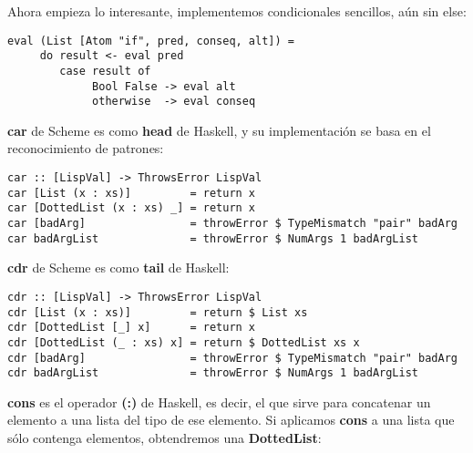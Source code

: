 Ahora empieza lo interesante, implementemos condicionales sencillos, a\'un sin else:\\

\begin{minipage}{\linewidth}
\begin{footnotesize}
\begin{lstlisting}[frame=single]
eval (List [Atom "if", pred, conseq, alt]) = 
     do result <- eval pred
        case result of
             Bool False -> eval alt
             otherwise  -> eval conseq
\end{lstlisting}
\end{footnotesize}
\end{minipage}

\textbf{car} de Scheme es como \textbf{head} de Haskell, y su implementaci\'on se basa en el reconocimiento de patrones:\\

\begin{minipage}{\linewidth}
\begin{footnotesize}
\begin{lstlisting}[frame=single]
car :: [LispVal] -> ThrowsError LispVal
car [List (x : xs)]         = return x
car [DottedList (x : xs) _] = return x
car [badArg]                = throwError $ TypeMismatch "pair" badArg
car badArgList              = throwError $ NumArgs 1 badArgList
\end{lstlisting}
\end{footnotesize}
\end{minipage}

\textbf{cdr} de Scheme es  como \textbf{tail} de Haskell:\\

\begin{minipage}{\linewidth}
\begin{footnotesize}
\begin{lstlisting}[frame=single]
cdr :: [LispVal] -> ThrowsError LispVal
cdr [List (x : xs)]         = return $ List xs
cdr [DottedList [_] x]      = return x
cdr [DottedList (_ : xs) x] = return $ DottedList xs x
cdr [badArg]                = throwError $ TypeMismatch "pair" badArg
cdr badArgList              = throwError $ NumArgs 1 badArgList
\end{lstlisting}
\end{footnotesize}
\end{minipage}

\textbf{cons} es el operador \textbf{(:)} de Haskell, es decir, el que sirve para concatenar un elemento a una lista del tipo de ese elemento. Si aplicamos \textbf{cons} a una lista que s\'olo contenga elementos, obtendremos una \textbf{DottedList}:\\

